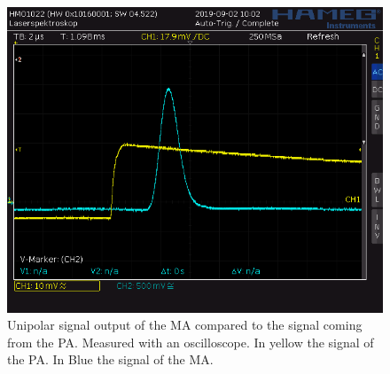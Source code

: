\documentclass[30pt,a4paper]{article}
\begin{document}
 	\begin{figure}[h]
 		\includegraphics[scale=0.42]{Bilder/OsziUnipolar}
 		\centering
 		\caption[Unipolar Signal]{Unipolar signal output of the MA compared to the signal coming from the PA. Measured with an oscilloscope. In yellow the signal of the PA. In Blue the signal of the MA.}
 		\label{Uni}
 	\end{figure}
 	
\end{document}
